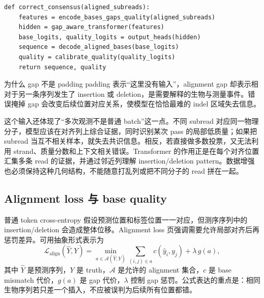 


\begin{lstlisting}[caption={DeepConsensus 式纠错流程（概念伪代码）}]
def correct_consensus(aligned_subreads):
    features = encode_bases_gaps_quality(aligned_subreads)
    hidden = gap_aware_transformer(features)
    base_logits, quality_logits = output_heads(hidden)
    sequence = decode_aligned_bases(base_logits)
    quality = calibrate_quality(quality_logits)
    return sequence, quality
\end{lstlisting}

\begin{warningbox}{为什么 gap 不是 padding}
padding 表示“这里没有输入”，alignment gap 却表示相对于另一条序列发生了 insertion 或 deletion，是需要解释的生物与测量事件。错误掩掉 gap 会改变后续位置对应关系，使模型在恰恰最难的 indel 区域失去信息。
\end{warningbox}

这个输入还体现了“多次观测不是普通 batch”这一点。不同 subread 对应同一物理分子，模型应该在对齐列上综合证据，同时识别某次 pass 的局部低质量；如果把 subread 当互不相关样本，就失去共识信息。相反，若直接做多数投票，又无法利用 strand、质量分数和上下文相关错误。Transformer 的作用正是在每个对齐位置汇集多条 read 的证据，并通过邻近列理解 insertion/deletion pattern。数据增强也必须保持这种几何结构，不能随意打乱列或把不同分子的 read 拼在一起。

\subsection{Alignment loss 与 base quality}

普通 token cross-entropy 假设预测位置和标签位置一一对应，但测序序列中的 insertion/deletion 会造成整体位移。Alignment loss 页强调需要允许局部对齐后再惩罚差异。可用抽象形式表示为
$$
\mathcal{L}_{\text{align}}(\hat Y,Y)=
\min_{a\in\mathcal{A}(\hat Y,Y)}
\sum_{(i,j)\in a} c(\hat y_i,y_j)+\lambda\,g(a),
$$
其中 $\hat Y$ 是预测序列，$Y$ 是 truth，$\mathcal{A}$ 是允许的 alignment 集合，$c$ 是 base mismatch 代价，$g(a)$ 是 gap 代价，$\lambda$ 控制 gap 惩罚。公式表达的重点是：相同生物序列若只差一个插入，不应被误判为后续所有位置都错。

